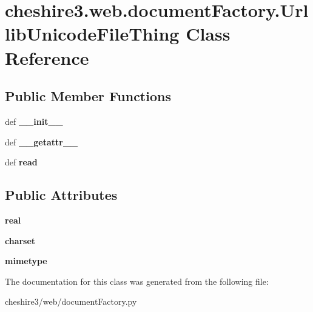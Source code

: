 \hypertarget{classcheshire3_1_1web_1_1document_factory_1_1_urllib_unicode_file_thing}{\section{cheshire3.\-web.\-document\-Factory.\-Urllib\-Unicode\-File\-Thing Class Reference}
\label{classcheshire3_1_1web_1_1document_factory_1_1_urllib_unicode_file_thing}
}
\subsection*{Public Member Functions}
\begin{DoxyCompactItemize}
\item 
\hypertarget{classcheshire3_1_1web_1_1document_factory_1_1_urllib_unicode_file_thing_ab25a7b64e87b02fdf295984c731355a5}{def {\bfseries \-\_\-\-\_\-init\-\_\-\-\_\-}}\label{classcheshire3_1_1web_1_1document_factory_1_1_urllib_unicode_file_thing_ab25a7b64e87b02fdf295984c731355a5}

\item 
\hypertarget{classcheshire3_1_1web_1_1document_factory_1_1_urllib_unicode_file_thing_a3f9c488f009407d56f37ca4a9b267518}{def {\bfseries \-\_\-\-\_\-getattr\-\_\-\-\_\-}}\label{classcheshire3_1_1web_1_1document_factory_1_1_urllib_unicode_file_thing_a3f9c488f009407d56f37ca4a9b267518}

\item 
\hypertarget{classcheshire3_1_1web_1_1document_factory_1_1_urllib_unicode_file_thing_aacb974fbd2be5a94f7a2ccaa6745ec78}{def {\bfseries read}}\label{classcheshire3_1_1web_1_1document_factory_1_1_urllib_unicode_file_thing_aacb974fbd2be5a94f7a2ccaa6745ec78}

\end{DoxyCompactItemize}
\subsection*{Public Attributes}
\begin{DoxyCompactItemize}
\item 
\hypertarget{classcheshire3_1_1web_1_1document_factory_1_1_urllib_unicode_file_thing_abe42ebf441ef17c4b32d8bd0dead73b1}{{\bfseries real}}\label{classcheshire3_1_1web_1_1document_factory_1_1_urllib_unicode_file_thing_abe42ebf441ef17c4b32d8bd0dead73b1}

\item 
\hypertarget{classcheshire3_1_1web_1_1document_factory_1_1_urllib_unicode_file_thing_a5f097e28bbe8c9012129404847b721a6}{{\bfseries charset}}\label{classcheshire3_1_1web_1_1document_factory_1_1_urllib_unicode_file_thing_a5f097e28bbe8c9012129404847b721a6}

\item 
\hypertarget{classcheshire3_1_1web_1_1document_factory_1_1_urllib_unicode_file_thing_ad97254febbd3ddb82a1b34db5e11efe9}{{\bfseries mimetype}}\label{classcheshire3_1_1web_1_1document_factory_1_1_urllib_unicode_file_thing_ad97254febbd3ddb82a1b34db5e11efe9}

\end{DoxyCompactItemize}


The documentation for this class was generated from the following file\-:\begin{DoxyCompactItemize}
\item 
cheshire3/web/document\-Factory.\-py\end{DoxyCompactItemize}

